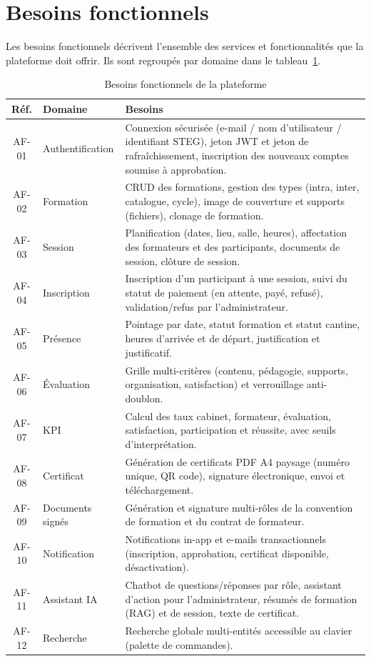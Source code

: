 \documentclass[12pt,a4paper]{report}
\begin{document}
\section{Besoins fonctionnels}

Les besoins fonctionnels décrivent l'ensemble des services et fonctionnalités que la plateforme doit offrir. Ils sont regroupés par domaine dans le tableau~\ref{tab:bf}.

\begin{table}[H]
\centering
\caption{Besoins fonctionnels de la plateforme}
\begin{tabular}{|c|p{2.6cm}|p{10cm}|}
\hline
\textbf{Réf.} & \textbf{Domaine} & \textbf{Besoins} \\
\hline
AF-01 & Authentification & Connexion sécurisée (e-mail / nom d'utilisateur / identifiant STEG), jeton JWT et jeton de rafraîchissement, inscription des nouveaux comptes soumise à approbation. \\
\hline
AF-02 & Formation & CRUD des formations, gestion des types (intra, inter, catalogue, cycle), image de couverture et supports (fichiers), clonage de formation. \\
\hline
AF-03 & Session & Planification (dates, lieu, salle, heures), affectation des formateurs et des participants, documents de session, clôture de session. \\
\hline
AF-04 & Inscription & Inscription d'un participant à une session, suivi du statut de paiement (en attente, payé, refusé), validation/refus par l'administrateur. \\
\hline
AF-05 & Présence & Pointage par date, statut formation et statut cantine, heures d'arrivée et de départ, justification et justificatif. \\
\hline
AF-06 & Évaluation & Grille multi-critères (contenu, pédagogie, supports, organisation, satisfaction) et verrouillage anti-doublon. \\
\hline
AF-07 & KPI & Calcul des taux cabinet, formateur, évaluation, satisfaction, participation et réussite, avec seuils d'interprétation. \\
\hline
AF-08 & Certificat & Génération de certificats PDF A4 paysage (numéro unique, QR code), signature électronique, envoi et téléchargement. \\
\hline
AF-09 & Documents signés & Génération et signature multi-rôles de la convention de formation et du contrat de formateur. \\
\hline
AF-10 & Notification & Notifications in-app et e-mails transactionnels (inscription, approbation, certificat disponible, désactivation). \\
\hline
AF-11 & Assistant IA & Chatbot de questions/réponses par rôle, assistant d'action pour l'administrateur, résumés de formation (RAG) et de session, texte de certificat. \\
\hline
AF-12 & Recherche & Recherche globale multi-entités accessible au clavier (palette de commandes). \\
\hline
\end{tabular}
\label{tab:bf}
\end{table}
\end{document}
